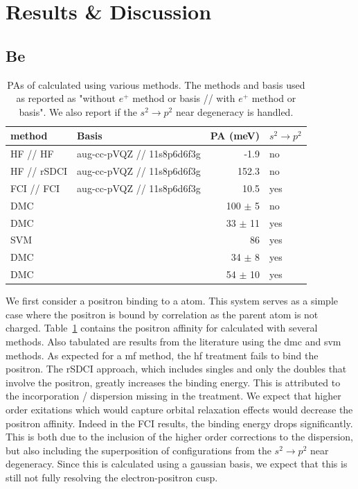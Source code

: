 \section{Results \& Discussion}
\subsection{Be}
\begin{table}
    \caption{\label{tab:wfn_BE} PAs of  calculated using various methods. The methods and basis used as reported as "without $e^{+}$ method or basis // with $e^{+}$ method or basis". We also report if the $s^2 \rightarrow p^2$ near degeneracy is handled.}
    \begin{tabular}{llrl}
method                          &  Basis                       & PA (meV)    & $s^2 \rightarrow p^2$ \\ \hline
HF // HF                        &  aug-cc-pVQZ // 11s8p6d6f3g  & -1.9        & no  \\
HF // rSDCI                     &  aug-cc-pVQZ // 11s8p6d6f3g  & 152.3       & no  \\
FCI // FCI                      &  aug-cc-pVQZ // 11s8p6d6f3g  & 10.5        & yes \\ \hline

DMC\cite{10.1063/1.1486447}    &                              & 100 $\pm$ 5 & no  \\
DMC\cite{10.1063/1.1486447}    &                              & 33 $\pm$ 11 & yes \\
SVM\cite{10.4208/jams.071510.072110a}    &                     & 86          & yes \\
DMC\cite{10.1021/acs.jctc.1c01193}       &                     & 34 $\pm$ 8  & yes \\
DMC\cite{10.1021/acs.jctc.1c01193}       &                     & 54 $\pm$ 10 & yes \\
\end{tabular}
\end{table}



We first consider a positron binding to a  atom. 
This system serves as a simple case where the positron is bound by correlation as the parent  atom is not charged.
Table~\ref{tab:wfn_BE} contains the positron affinity for  calculated with several methods.
Also tabulated are results from the literature using the \gls{dmc} and \gls{svm} methods.
As expected for a \gls{mf} method, the \gls{hf} treatment fails to bind the positron.
The \gls{rSDCI} approach, which includes singles and only the doubles that involve the positron, greatly increases the binding energy.
This is attributed to the incorporation / dispersion missing in the  treatment.
We expect that higher order exitations which would capture orbital relaxation effects would decrease the positron affinity.
Indeed in the FCI results, the binding energy drops significantly.
This is both due to the inclusion of the higher order corrections to the dispersion, but also including the superposition of configurations from the $s^2 \rightarrow p^2$ near degeneracy.
Since this is calculated using a gaussian basis, we expect that this is still not fully resolving the electron-positron cusp.

